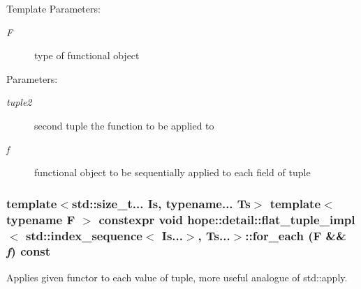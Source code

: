 \begin{Desc}
\item[Template Parameters:]
\begin{description}
\item[{\em F}]type of functional object \end{description}
\end{Desc}
\begin{Desc}
\item[Parameters:]
\begin{description}
\item[{\em tuple2}]second tuple the function to be applied to \item[{\em f}]functional object to be sequentially applied to each field of tuple \end{description}
\end{Desc}
\hypertarget{classhope_1_1detail_1_1flat__tuple__impl_3_01std_1_1index__sequence_3_01_is_8_8_8_4_00_01_ts_8_8_8_4_666a36927404ca2f5d9faeeb9da9c039}{
\subsubsection[{for\_\-each}]{\setlength{\rightskip}{0pt plus 5cm}template$<$std::size\_\-t... Is, typename... Ts$>$ template$<$typename F $>$ constexpr void hope::detail::flat\_\-tuple\_\-impl$<$ std::index\_\-sequence$<$ Is...$>$, Ts...$>$::for\_\-each (F \&\& {\em f}) const}}
\label{classhope_1_1detail_1_1flat__tuple__impl_3_01std_1_1index__sequence_3_01_is_8_8_8_4_00_01_ts_8_8_8_4_666a36927404ca2f5d9faeeb9da9c039}


Applies given functor to each value of tuple, more useful analogue of std::apply. 

